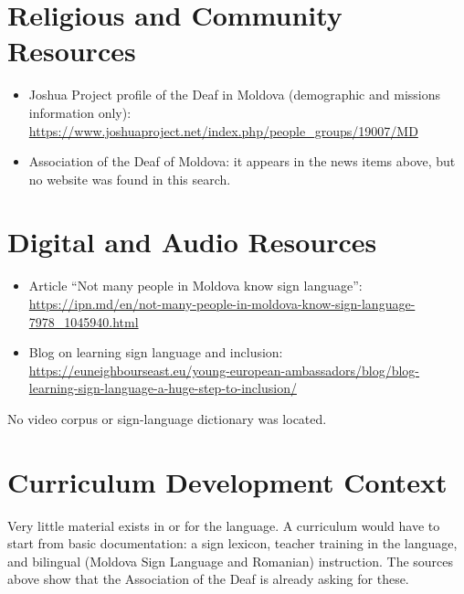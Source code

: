 \documentclass[12pt]{article}
\begin{document}
\section{Religious and Community Resources}
\begin{itemize}
\item Joshua Project profile of the Deaf in Moldova (demographic and missions information only): \url{https://www.joshuaproject.net/index.php/people_groups/19007/MD}
\item Association of the Deaf of Moldova: it appears in the news items above, but no website was found in this search.
\end{itemize}

\section{Digital and Audio Resources}
\begin{itemize}
\item Article ``Not many people in Moldova know sign language'': \url{https://ipn.md/en/not-many-people-in-moldova-know-sign-language-7978_1045940.html}
\item Blog on learning sign language and inclusion: \url{https://euneighbourseast.eu/young-european-ambassadors/blog/blog-learning-sign-language-a-huge-step-to-inclusion/}
\end{itemize}
No video corpus or sign-language dictionary was located.

\section{Curriculum Development Context}
Very little material exists in or for the language. A curriculum would have to start from basic documentation: a sign lexicon, teacher training in the language, and bilingual (Moldova Sign Language and Romanian) instruction. The sources above show that the Association of the Deaf is already asking for these.
\end{document}

